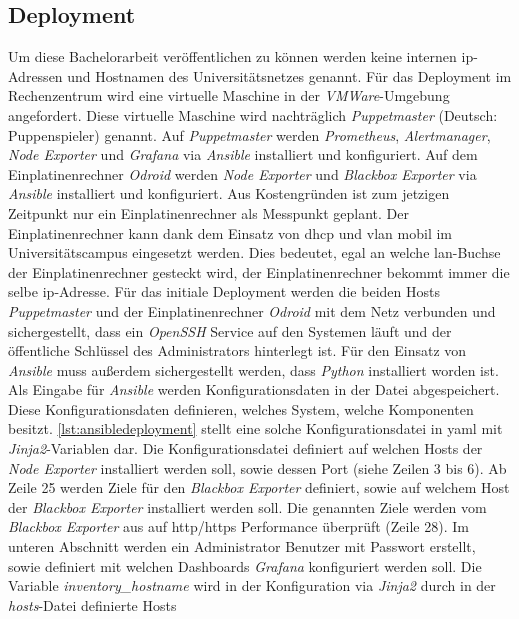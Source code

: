 \documentclass[titlepage]{report}
\begin{document}
\subsection{Deployment}
Um diese Bachelorarbeit veröffentlichen zu können
werden keine internen \gls{ip}\hyp{}Adressen und Hostnamen des
Universitätsnetzes genannt.  Für das Deployment im Rechenzentrum wird
eine virtuelle Maschine in der \emph{VMWare}\hyp{}Umgebung angefordert.
Diese virtuelle Maschine wird nachträglich \emph{Puppetmaster} (Deutsch:
Puppenspieler) genannt. Auf \emph{Puppetmaster}  werden
\emph{Prometheus}, \emph{Alertmanager}, \emph{Node Exporter} und
\emph{Grafana} via \emph{Ansible} installiert und konfiguriert. Auf dem
Einplatinenrechner \emph{Odroid} werden \emph{Node Exporter} und
\emph{Blackbox Exporter} via \emph{Ansible} installiert und
konfiguriert. Aus Kostengründen ist zum jetzigen Zeitpunkt nur ein
Einplatinenrechner als Messpunkt geplant. Der Einplatinenrechner kann
dank dem Einsatz von \gls{dhcp} und \gls{vlan} mobil im
Universitätscampus eingesetzt werden. Dies bedeutet, egal an welche
\gls{lan}\hyp{}Buchse der Einplatinenrechner gesteckt wird, der
Einplatinenrechner bekommt immer die selbe \gls{ip}\hyp{}Adresse.
Für das initiale Deployment werden die beiden Hosts \emph{Puppetmaster}
und der Einplatinenrechner \emph{Odroid} mit dem Netz verbunden und
sichergestellt, dass ein \emph{OpenSSH} Service auf den Systemen läuft
und der öffentliche Schlüssel des Administrators hinterlegt ist. Für den
Einsatz von \emph{Ansible} muss außerdem sichergestellt werden, dass
\emph{Python} installiert worden ist. Als Eingabe für \emph{Ansible}
werden Konfigurationsdaten in der Datei 
abgespeichert. Diese Konfigurationsdaten definieren, welches System,
welche Komponenten besitzt. \autoref{lst:ansibledeployment} stellt eine
solche Konfigurationsdatei in \gls{yaml} mit
\emph{Jinja2}\hyp{}Variablen dar. Die Konfigurationsdatei definiert auf
welchen Hosts der \emph{Node Exporter} installiert werden soll, sowie
dessen Port (siehe Zeilen 3 bis 6). Ab Zeile 25 werden Ziele für den
\emph{Blackbox Exporter} definiert, sowie auf welchem Host der
\emph{Blackbox Exporter} installiert werden soll. Die genannten Ziele
werden vom \emph{Blackbox Exporter} aus auf \gls{http}/\gls{https}
Performance überprüft (Zeile 28). Im unteren Abschnitt werden ein
Administrator Benutzer mit Passwort erstellt, sowie definiert mit
welchen Dashboards \emph{Grafana} konfiguriert werden soll. Die
Variable \emph{ inventory\_hostname } wird in der Konfiguration via
\emph{Jinja2} durch in der \emph{hosts}\hyp{}Datei definierte Hosts
\end{document}
